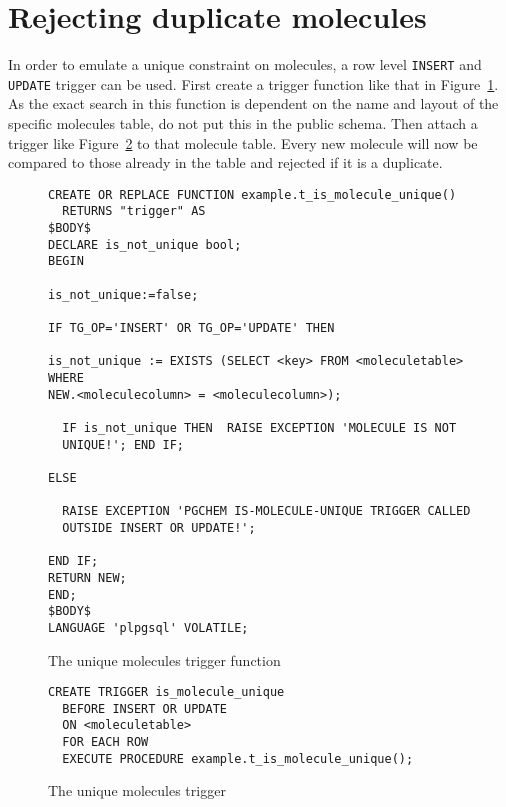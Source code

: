 \documentclass[a4paper]{article}
\begin{document}
\section{Rejecting duplicate molecules}
In order to emulate a unique constraint on molecules, a row level \texttt{INSERT} and \texttt{UPDATE} trigger can be used. First create a trigger function like that in Figure~\ref{fig:unique_trig_func}. As the exact search in this function is dependent on the name and layout of the specific molecules table, do not put this in the public schema. Then attach a trigger like Figure~\ref{fig:unique_trig} to that molecule table. Every new molecule will now be compared to those already in the table and rejected if it is a duplicate.
\begin{figure}[tb]
\begin{verbatim}
CREATE OR REPLACE FUNCTION example.t_is_molecule_unique()
  RETURNS "trigger" AS
$BODY$
DECLARE is_not_unique bool;
BEGIN

is_not_unique:=false;

IF TG_OP='INSERT' OR TG_OP='UPDATE' THEN

is_not_unique := EXISTS (SELECT <key> FROM <moleculetable> WHERE
NEW.<moleculecolumn> = <moleculecolumn>);

  IF is_not_unique THEN  RAISE EXCEPTION 'MOLECULE IS NOT
  UNIQUE!'; END IF;

ELSE

  RAISE EXCEPTION 'PGCHEM IS-MOLECULE-UNIQUE TRIGGER CALLED
  OUTSIDE INSERT OR UPDATE!';

END IF;
RETURN NEW;
END;
$BODY$
LANGUAGE 'plpgsql' VOLATILE;
\end{verbatim}
\caption{The unique molecules trigger function}
	\label{fig:unique_trig_func}
\end{figure}
\begin{figure}[tb]
\begin{verbatim}
CREATE TRIGGER is_molecule_unique
  BEFORE INSERT OR UPDATE
  ON <moleculetable>
  FOR EACH ROW
  EXECUTE PROCEDURE example.t_is_molecule_unique();
\end{verbatim}
\caption{The unique molecules trigger}
	\label{fig:unique_trig}
\end{figure}
\end{document}
